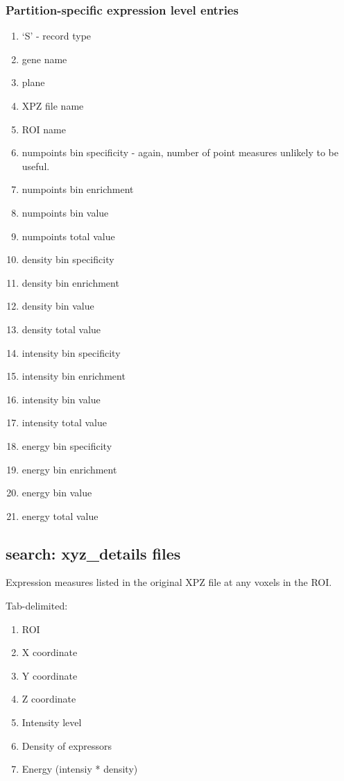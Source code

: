 \documentclass[10pt]{article}
\begin{document}
\subsubsection{Partition-specific expression level entries}

\begin{enumerate}
\item `S' - record type
\item gene name
\item plane
\item XPZ file name
\item ROI name
\item numpoints bin specificity - again, number of point measures unlikely to be useful.
\item numpoints bin enrichment
\item numpoints bin value
\item numpoints total value

\item density bin specificity
\item density bin enrichment
\item density bin value
\item density total value

\item intensity bin specificity
\item intensity bin enrichment
\item intensity bin value
\item intensity total value

\item energy bin specificity
\item energy bin enrichment
\item energy bin value
\item energy total value
\end{enumerate}

\subsection{search: xyz\_details files}

Expression measures listed in the original XPZ file at any voxels in the ROI.

Tab-delimited:
\begin{enumerate}
\item ROI
\item X coordinate
\item Y coordinate
\item Z coordinate
\item Intensity level
\item Density of expressors
\item Energy (intensiy * density)
\end{enumerate}
\end{document}
